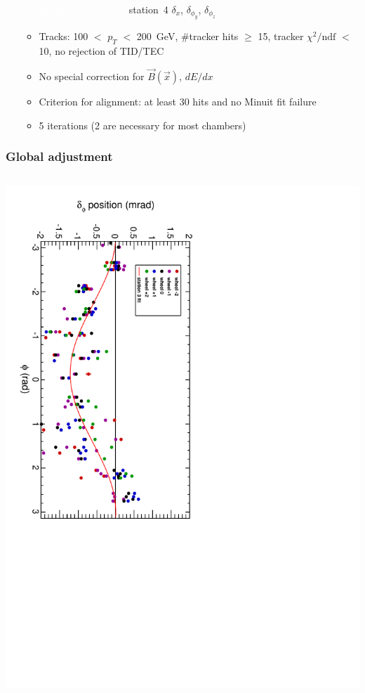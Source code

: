 \documentclass[compress]{beamer}
\begin{document}
\begin{frame}
\begin{itemize}
\begin{itemize}
\textcolor{white}{Aligned parameters:} station~4 $\delta_x$, $\delta_{\phi_y}$, $\delta_{\phi_z}$
\item \scriptsize Tracks: 100 $<$ $p_T$ $<$ 200~GeV, \#tracker hits $\ge$ 15, tracker $\chi^2/\mbox{ndf}$ $<$ 10, no rejection of TID/TEC
\item \scriptsize No special correction for $\vec{B}(\vec{x})$, $dE/dx$
\item \scriptsize Criterion for alignment: at least 30 hits and no Minuit fit failure
\item \scriptsize 5 iterations (2 are necessary for most chambers)
\end{itemize}
\end{itemize}
\end{frame}

\begin{frame}
\frametitle{Global adjustment}

\begin{columns}
\includegraphics[height=\linewidth, angle=90]{NOV4DT_vs_HARDWARE_phi.pdf}


\end{columns}
\end{frame}
\end{document}
